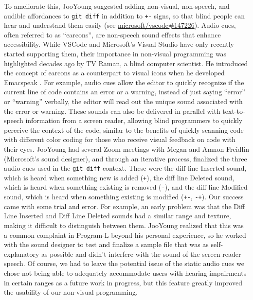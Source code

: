\documentclass[sigconf]{acmart}
\begin{document}
To ameliorate this, JooYoung suggested adding non-visual, non-speech,
and audible affordances to \texttt{git\ diff} in addition to \texttt{+-}
signs, so that blind people can hear and understand them easily (see
\href{https://github.com/microsoft/vscode/issues/147226}{microsoft/vscode\#147226}).
Audio cues, often referred to as ``earcons'', are non-speech sound
effects that enhance accessibility. While VSCode and Microsoft's Visual
Studio have only recently started supporting them, their importance in
non-visual programming was highlighted decades ago by TV Raman, a blind
computer scientist. He introduced the concept of earcons as a
counterpart to visual icons when he developed Emacspeak
\citep{ramanEmacspeakSpeechInterface1996}. For example, audio cues allow
the editor to quickly recognize if the current line of code contains an
error or a warning, instead of just saying ``error'' or ``warning''
verbally, the editor will read out the unique sound associated with the
error or warning. These sounds can also be delivered in parallel with
text-to-speech information from a screen reader, allowing blind
programmers to quickly perceive the context of the code, similar to the
benefits of quickly scanning code with different color coding for those
who receive visual feedback on code with their eyes. JooYoung had
several Zoom meetings with Megan and Amnon Freidlin (Microsoft's sound
designer), and through an iterative process, finalized the three audio
cues used in the \texttt{git\ diff} context. These were the diff line
Inserted sound, which is heard when something new is added (\texttt{+}),
the diff line Deleted sound, which is heard when something existing is
removed (\texttt{-}), and the diff line Modified sound, which is heard
when something existing is modified (\texttt{+-}, \texttt{-+}). Our
success came with some trial and error. For example, an early problem
was that the Diff Line Inserted and Diff Line Deleted sounds had a
similar range and texture, making it difficult to distinguish between
them. JooYoung realized that this was a common complaint in Program-L
beyond his personal experience, so he worked with the sound designer to
test and finalize a sample file that was as self-explanatory as possible
and didn't interfere with the sound of the screen reader speech. Of
course, we had to leave the potential issue of the static audio cues we
chose not being able to adequately accommodate users with hearing
impairments in certain ranges as a future work in progress, but this
feature greatly improved the usability of our non-visual programming.
\end{document}
